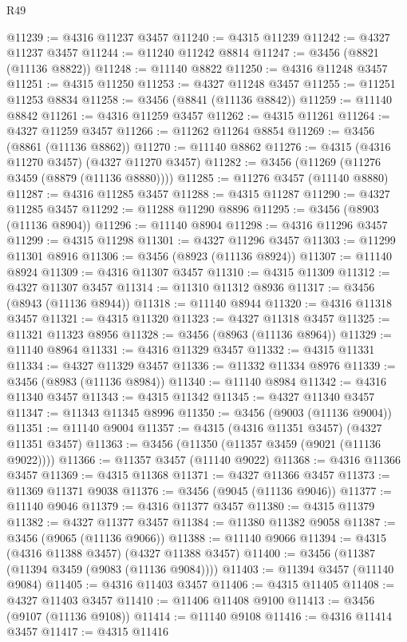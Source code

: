 \begin{lexlean}{R49}
\begin{coremodule}
@11239 := @4316 @11237 @3457
@11240 := @4315 @11239
@11242 := @4327 @11237 @3457
@11244 := @11240 @11242 @8814
@11247 := @3456 (@8821 (@11136 @8822))
@11248 := @11140 @8822
@11250 := @4316 @11248 @3457
@11251 := @4315 @11250
@11253 := @4327 @11248 @3457
@11255 := @11251 @11253 @8834
@11258 := @3456 (@8841 (@11136 @8842))
@11259 := @11140 @8842
@11261 := @4316 @11259 @3457
@11262 := @4315 @11261
@11264 := @4327 @11259 @3457
@11266 := @11262 @11264 @8854
@11269 := @3456 (@8861 (@11136 @8862))
@11270 := @11140 @8862
@11276 := @4315 (@4316 @11270 @3457) (@4327 @11270 @3457)
@11282 := @3456 (@11269 (@11276 @3459 (@8879 (@11136 @8880))))
@11285 := @11276 @3457 (@11140 @8880)
@11287 := @4316 @11285 @3457
@11288 := @4315 @11287
@11290 := @4327 @11285 @3457
@11292 := @11288 @11290 @8896
@11295 := @3456 (@8903 (@11136 @8904))
@11296 := @11140 @8904
@11298 := @4316 @11296 @3457
@11299 := @4315 @11298
@11301 := @4327 @11296 @3457
@11303 := @11299 @11301 @8916
@11306 := @3456 (@8923 (@11136 @8924))
@11307 := @11140 @8924
@11309 := @4316 @11307 @3457
@11310 := @4315 @11309
@11312 := @4327 @11307 @3457
@11314 := @11310 @11312 @8936
@11317 := @3456 (@8943 (@11136 @8944))
@11318 := @11140 @8944
@11320 := @4316 @11318 @3457
@11321 := @4315 @11320
@11323 := @4327 @11318 @3457
@11325 := @11321 @11323 @8956
@11328 := @3456 (@8963 (@11136 @8964))
@11329 := @11140 @8964
@11331 := @4316 @11329 @3457
@11332 := @4315 @11331
@11334 := @4327 @11329 @3457
@11336 := @11332 @11334 @8976
@11339 := @3456 (@8983 (@11136 @8984))
@11340 := @11140 @8984
@11342 := @4316 @11340 @3457
@11343 := @4315 @11342
@11345 := @4327 @11340 @3457
@11347 := @11343 @11345 @8996
@11350 := @3456 (@9003 (@11136 @9004))
@11351 := @11140 @9004
@11357 := @4315 (@4316 @11351 @3457) (@4327 @11351 @3457)
@11363 := @3456 (@11350 (@11357 @3459 (@9021 (@11136 @9022))))
@11366 := @11357 @3457 (@11140 @9022)
@11368 := @4316 @11366 @3457
@11369 := @4315 @11368
@11371 := @4327 @11366 @3457
@11373 := @11369 @11371 @9038
@11376 := @3456 (@9045 (@11136 @9046))
@11377 := @11140 @9046
@11379 := @4316 @11377 @3457
@11380 := @4315 @11379
@11382 := @4327 @11377 @3457
@11384 := @11380 @11382 @9058
@11387 := @3456 (@9065 (@11136 @9066))
@11388 := @11140 @9066
@11394 := @4315 (@4316 @11388 @3457) (@4327 @11388 @3457)
@11400 := @3456 (@11387 (@11394 @3459 (@9083 (@11136 @9084))))
@11403 := @11394 @3457 (@11140 @9084)
@11405 := @4316 @11403 @3457
@11406 := @4315 @11405
@11408 := @4327 @11403 @3457
@11410 := @11406 @11408 @9100
@11413 := @3456 (@9107 (@11136 @9108))
@11414 := @11140 @9108
@11416 := @4316 @11414 @3457
@11417 := @4315 @11416

\end{coremodule}
\end{lexlean}
